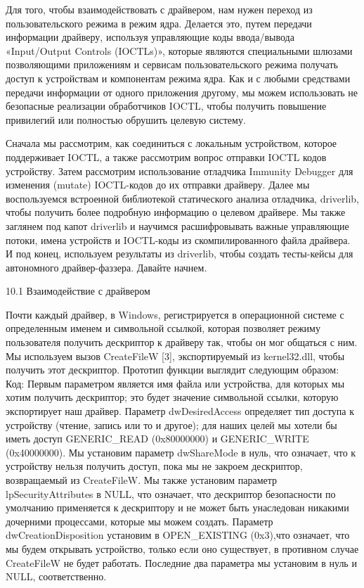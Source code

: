 \documentclass[12pt, a4paper, oneside]{book}
\begin{document}
Для того, чтобы взаимодействовать с драйвером, нам нужен переход из пользовательского режима в режим ядра. Делается это, путем передачи информации драйверу, используя управляющие коды ввода/вывода «Input/Output Controls (IOCTLs)», которые являются специальными шлюзами позволяющими приложениям и сервисам пользовательского режима получать доступ к устройствам и компонентам режима ядра. Как и с любыми средствами передачи информации от одного приложения другому, мы можем использовать не безопасные реализации обработчиков IOCTL, чтобы получить повышение привилегий или полностью обрушить целевую систему.

Сначала мы рассмотрим, как соединиться с локальным устройством, которое поддерживает IOCTL, а также рассмотрим вопрос отправки IOCTL кодов устройству. Затем рассмотрим использование отладчика Immunity Debugger для изменения (mutate) IOCTL-кодов до их отправки драйверу. Далее мы воспользуемся встроенной библиотекой статического анализа отладчика, driverlib, чтобы получить более подробную информацию о целевом драйвере. Мы также заглянем под капот driverlib и научимся расшифровывать важные управляющие потоки, имена устройств и IOCTL-коды из скомпилированного файла драйвера. И под конец, используем результаты из driverlib, чтобы создать тесты-кейсы для автономного драйвер-фаззера. Давайте начнем.


10.1 Взаимодействие с драйвером

Почти каждый драйвер, в Windows, регистрируется в операционной системе с определенным именем и символьной ссылкой, которая позволяет режиму пользователя получить дескриптор к драйверу так, чтобы он мог общаться с ним. Мы используем вызов CreateFileW [3], экспортируемый из kernel32.dll, чтобы получить этот дескриптор. Прототип функции выглядит следующим образом:
Код:
Первым параметром является имя файла или устройства, для которых мы хотим получить дескриптор; это будет значение символьной ссылки, которую экспортирует наш драйвер. Параметр dwDesiredAccess определяет тип доступа к устройству (чтение, запись или то и другое); для наших целей мы хотели бы иметь доступ GENERIC\_READ (0x80000000) и GENERIC\_WRITE (0x40000000). Мы установим параметр dwShareMode в нуль, что означает, что к устройству нельзя получить доступ, пока мы не закроем дескриптор, возвращаемый из CreateFileW. Мы также установим параметр lpSecurityAttributes в NULL, что означает, что дескриптор безопасности по умолчанию применяется к дескриптору и не может быть унаследован никакими дочерними процессами, которые мы можем создать. Параметр dwCreationDisposition установим в OPEN\_EXISTING (0x3),что означает, что мы будем открывать устройство, только если оно существует, в противном случае CreateFileW не будет работать. Последние два параметра мы установим в нуль и NULL, соответственно. 
\end{document}
